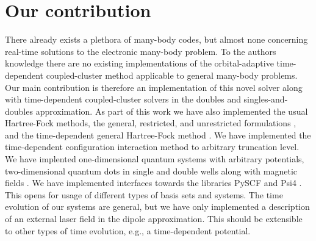     \section{Our contribution}
        There already exists a plethora of many-body codes, but almost none
        concerning real-time solutions to the electronic many-body problem.
        To the authors knowledge there are no existing implementations of the
        orbital-adaptive time-dependent coupled-cluster method applicable to
        general many-body problems.
        Our main contribution is therefore an implementation of this novel
        solver along with time-dependent coupled-cluster solvers in the doubles
        and singles-and-doubles approximation.
        As part of this work we have also implemented the usual Hartree-Fock
        methods, the general, restricted, and unrestricted formulations
        \cite{szabo1996modern}, and the time-dependent general Hartree-Fock
        method \cite{hochstuhl2014time}.
        We have implemented the time-dependent configuration interaction method
        to arbitrary truncation level.
        We have implented one-dimensional quantum systems with arbitrary
        potentials, two-dimensional quantum dots in single and double wells
        along with magnetic fields \cite{greg-winther}.
        We have implemented interfaces towards the libraries PySCF \cite{pyscf}
        and Psi4 \cite{psi4}.
        This opens for usage of different types of basis sets and systems.
        The time evolution of our systems are general, but we have only
        implemented a description of an external laser field in the dipole
        approximation.
        This should be extensible to other types of time evolution, e.g., a
        time-dependent potential.


